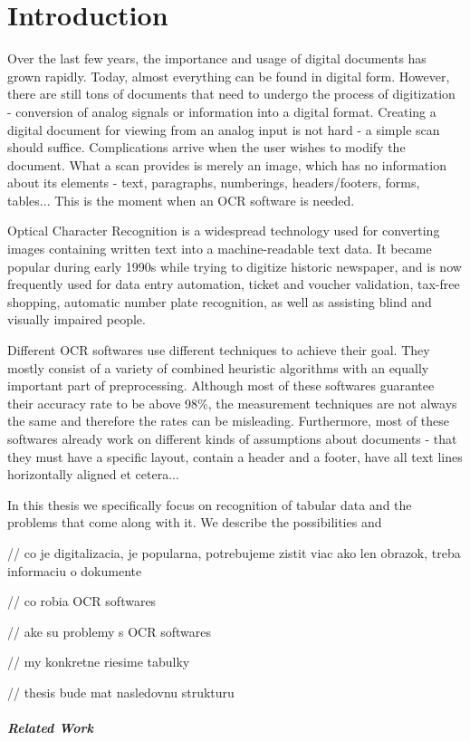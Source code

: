 \chapter*{Introduction}

Over the last few years, the importance and usage of digital documents has grown rapidly. Today, almost everything can be found in digital form. However, there are still tons of documents that need to undergo the process of digitization - conversion of analog signals or information into a digital format. Creating a digital document for viewing from an analog input is not hard - a simple scan should suffice. Complications arrive when the user wishes to modify the document. What a scan provides is merely an image, which has no information about its elements - text, paragraphs, numberings, headers/footers, forms, tables... This is the moment when an OCR software is needed.

Optical Character Recognition is a widespread technology used for converting images containing written text into a machine-readable text data. It became popular during early 1990s while trying to digitize historic newspaper, and is now frequently used for data entry automation, ticket and voucher validation, tax-free shopping, automatic number plate recognition, as well as assisting blind and visually impaired people.

Different OCR softwares use different techniques to achieve their goal. They mostly consist of a variety of combined heuristic algorithms with an equally important part of preprocessing. Although most of these softwares guarantee their accuracy rate to be above 98\%, the measurement techniques are not always the same and therefore the rates can be misleading.
Furthermore, most of these softwares already work on different kinds of assumptions about documents - that they must have a specific layout, contain a header and a footer, have all text lines horizontally aligned et cetera...

In this thesis we specifically focus on recognition of tabular data and the problems that come along with it. We describe the possibilities and 



// co je digitalizacia, je popularna, potrebujeme zistit viac ako len obrazok, treba informaciu o dokumente


// co robia OCR softwares


// ake su problemy s OCR softwares


// my konkretne riesime tabulky


// thesis bude mat nasledovnu strukturu


\paragraph{Related Work}


